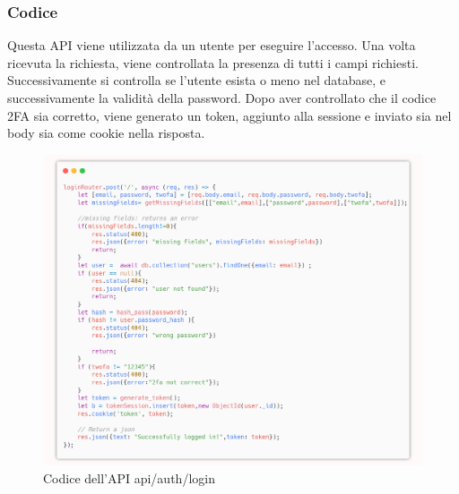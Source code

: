 \documentclass{report}
\begin{document}
\subsubsection*{Codice}
Questa API viene utilizzata da un utente per eseguire l'accesso.
Una volta ricevuta la richiesta, viene controllata la presenza di tutti i campi richiesti.
Successivamente si controlla se l'utente esista o meno nel database, e successivamente la validità della password.
Dopo aver controllato che il codice 2FA sia corretto, viene generato un token, aggiunto alla sessione e inviato sia nel body sia come cookie nella risposta.


\begin{figure}[H]
	\centering\includegraphics[width=1\textwidth]{images/microservizio-autenticazione/login-carbon.png}
	Codice dell'API api/auth/login
\end{figure}
\end{document}
